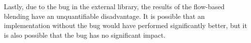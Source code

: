 Lastly, due to the bug in the external library, the results of the flow-based blending have an unquantifiable disadvantage. It is possible that an implementation without the bug would have performed significantly better, but it is also possible that the bug has no significant impact.

